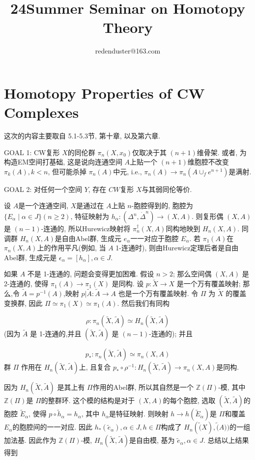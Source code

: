 \documentclass{ctexart}
\title{24Summer Seminar on Homotopy Theory}
\author{redenduster@163.com}
\theoremstyle{plain}
\theoremstyle{definition}
\begin{document}
    \maketitle
    \tableofcontents
    
    \newpage
    
    \section{Homotopy Properties of CW Complexes}
        这次的内容主要取自\cite{Whitehead1978} 5.1-5.3节, \cite{May1999}第十章, 以及\cite{Switzer1975}第六章.

        GOAL 1: CW复形 $X$的同伦群 $\pi_{n}(X,x_0)$仅取决于其 $(n+1)$维骨架. 或者, 为构造EM空间打基础, 这是说向连通空间 $A$上贴一个 $(n+1)$维胞腔不改变 $\pi_{k}(A), k<n$, 但可能杀掉 $\pi_{n}(A)$中元, i.e., $\pi_{n}(A)\to \pi_{n}(A \cup _{f}e^{n+1})$是满射.

        GOAL 2: 对任何一个空间 $Y$, 存在 $CW$复形 $X$与其弱同伦等价.

        设 $A$是一个连通空间, $X$是通过在 $A$上贴 $n$-胞腔得到的, 胞腔为 $\{E_{\alpha}\mid \alpha \in J\}(n\ge 2)$, 特征映射为 $h_{\alpha}:(\Delta^{n},\dot{\Delta}^{n})\to (X,A)$. 则复形偶 $(X,A)$是 $(n-1)$-连通的, 所以Hurewicz映射将 $\pi_{n}^{\dagger}(X,A)$同构地映到 $H_{n}(X,A)$. 同调群 $H_{n}(X,A)$是自由Abel群, 生成元 $e_{\alpha}$一一对应于胞腔 $E_{\alpha}$. 若 $\pi_1(A)$在 $\pi_{n}(X,A)$上的作用平凡(例如, 当 $A$ 1-连通时), 则由Hurewicz定理后者是自由Abel群, 生成元是 $\epsilon_{\alpha}=[h_{\alpha}], \alpha \in J$.

        如果 $A$ 不是 1-连通的, 问题会变得更加困难. 假设 $n > 2$; 那么空间偶 $(X, A)$ 是 2-连通的, 使得 $\pi_1(A) \rightarrow \pi_1(X)$ 是同构. 设 $p : \tilde{X} \rightarrow X$ 是一个万有覆盖映射; 那么,令 $\tilde{A} = p^{-1}(A)$,映射 $p | \tilde{A} : \tilde{A} \rightarrow A$ 也是一个万有覆盖映射. 令 $\Pi$ 为 $\tilde{X}$ 的覆盖变换群, 因此 $\Pi \simeq \pi_1(X) \simeq \pi_1(A)$. 然后我们有同构

        \[
        \rho : \pi_n(\tilde{X}, \tilde{A}) \simeq H_n(\tilde{X}, \tilde{A})
        \]
        (因为 $\tilde{A}$ 是 1-连通的,并且 $(\tilde{X}, \tilde{A})$ 是 $ (n-1)$-连通的); 并且

        \[
        p_* : \pi_n(\tilde{X}, \tilde{A}) \simeq \pi_n(X, A)
        \]
        群 $\Pi$ 作用在 $H_{n}(\tilde{X},\tilde{A})$上, 且复合 $p_* \circ \rho^{-1}:H_{n}(\tilde{X},\tilde{A})\to \pi_{n}(X,A)$是同构.

        因为 $H_{n}(\tilde{X},\tilde{A})$ 是其上有 $\Pi$作用的Abel群, 所以其自然是一个 $\mathbb{Z}(\Pi)$-模, 其中 $\mathbb{Z}(\Pi)$是 $\Pi$的整群环. 这个模的结构是对于 $(X,A)$的每个胞腔, 选取 $(\tilde{X},\tilde{A})$的胞腔 $\tilde{E}_{\alpha}$, 使得 $p\circ \tilde{h}_{\alpha}=h_{\alpha}$, 其中 $h_{\alpha}$是特征映射. 则映射 $h\to h(\tilde{E}_{\alpha})$是 $\Pi$和覆盖 $E_{\alpha}$的胞腔间的一一对应. 因此 $h_* (\tilde{e}_{\alpha}), \alpha \in J, h \in \Pi$构成了 $H_{n}(\tilde(X),\tilde(A))$的一组加法基. 因此作为 $\mathbb{Z}(\Pi)$-模, $H_{n}(\tilde{X},\tilde{A})$是自由模, 基为 $\tilde{e}_{\alpha}, \alpha \in J$. 总结以上结果得到
\end{document}
